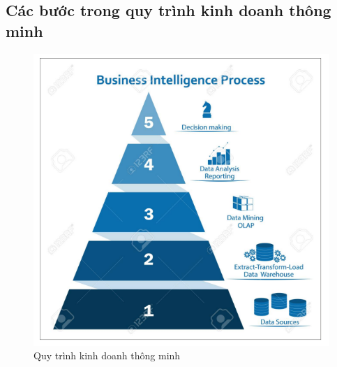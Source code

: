 \subsection{Các bước trong quy trình kinh doanh thông minh}
\begin{center}
            \begin{figure}[!h]
                \centering
                \includegraphics[scale = 1]{figures/Duyen/Quy trình kinh doanh thông minh.PNG}
              \caption{Quy trình kinh doanh thông minh}
            \end{figure}
\end{center}
\newpage
